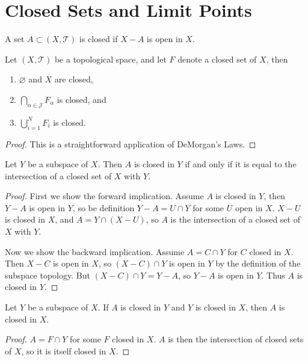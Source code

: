 \documentclass[10pt]{report}
\begin{document}

\section{Closed Sets and Limit Points}

\begin{defn}
	A set $A \subset (X, \mathcal{T})$ is closed if $X-A$ is open in $X$.
\end{defn}

\begin{thrm}
	Let $(X, \mathcal{T})$ be a topological space, and let $F$ denote a closed set of $X$, then
	\begin{enumerate}
		\item $\varnothing$ and $X$ are closed,
		\item $\bigcap_{\alpha\in\mathcal{J}}F_\alpha$ is closed, and
		\item $\bigcup_{i=1}^N F_i$ is closed.
	\end{enumerate}
\end{thrm}
\begin{proof}
This is a straightforward application of DeMorgan's Laws.
\end{proof}

\begin{prop}
	\label{closed-isct}
Let $Y$ be a subspace of $X$. Then $A$ is closed in $Y$ if and only if it is equal to the intersection of a closed set of $X$ with $Y$.
\end{prop}
\begin{proof}
	First we show the forward implication. Assume $A$ is closed in $Y$, then $Y-A$ is open in $Y$, so be definition $Y-A=U \cap Y$ for some $U$ open in $X$. $X-U$ is closed in $X$, and $A = Y \cap (X-U)$, so $A$ is the intersection of a closed set of $X$ with $Y$.

	Now we show the backward implication. Assume $A = C \cap Y$ for $C$ closed in $X$. Then $X-C$ is open in $X$, so $(X-C) \cap Y$ is open in $Y$ by the definition of the subspace topology. But $(X-C) \cap Y = Y-A$, so $Y-A$ is open in $Y$. Thus $A$ is closed in $Y$.
\end{proof}

\begin{prop}
Let $Y$ be a subspace of $X$. If $A$ is closed in $Y$ and $Y$ is closed in $X$, then $A$ is closed in $X$.
\end{prop}
\begin{proof}
	$A = F \cap Y$ for some $F$ closed in $X$. $A$ is then the intersection of closed sets of $X$, so it is itself closed in $X$.
\end{proof}
\end{document}
